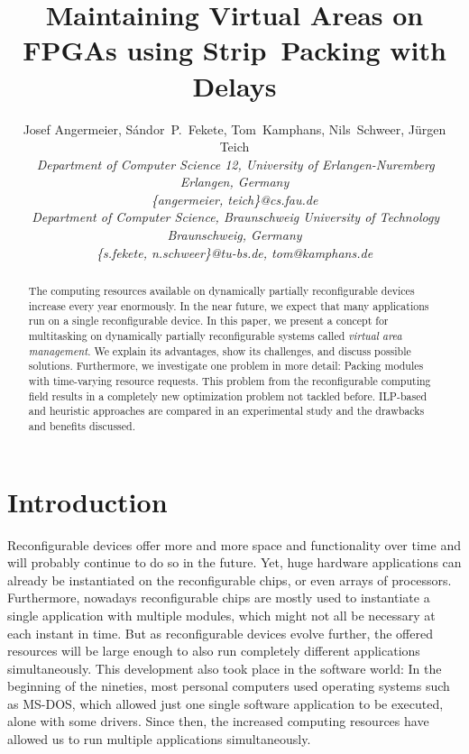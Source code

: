 \documentclass[10pt,journal]{IEEEtran}
\title{Maintaining Virtual Areas on FPGAs using Strip~Packing with Delays}
\author{{Josef Angermeier{\small },
S\'andor~P.~Fekete{\small },
Tom~Kamphans{\small },
Nils~Schweer{\small },
J\"urgen Teich{\small }}
\vspace{1.6mm}\\
\fontsize{10}{10}\selectfont\itshape
\,Department of Computer Science 12, University of Erlangen-Nuremberg\\
Erlangen, Germany\\
\fontsize{9}{9}\selectfont\ttfamily\upshape
\{angermeier, teich\}@cs.fau.de\vspace{1.2mm}\\
\fontsize{10}{10}\selectfont\rmfamily\itshape
\,Department of Computer Science, Braunschweig University of Technology\\
Braunschweig, Germany\\
\fontsize{9}{9}\selectfont\ttfamily\upshape
\{s.fekete, n.schweer\}@tu-bs.de, tom@kamphans.de}
\begin{document}
\maketitle
\begin{abstract}
  The computing resources available on dynamically partially
  reconfigurable devices increase every year enormously. In the near
  future, we expect that many applications run on a single
  reconfigurable device. In this paper, we present a concept for
  multitasking on dynamically partially reconfigurable systems called
  {\em virtual area management}. We explain its advantages, show its
  challenges, and discuss possible solutions. Furthermore, we investigate
  one problem in more detail: Packing modules with time-varying 
  resource requests.
  This problem
  from the reconfigurable computing field results in a completely new
  optimization problem not tackled before. ILP-based and heuristic
  approaches are compared in an experimental study and the drawbacks
  and benefits discussed.

\end{abstract}



\section{Introduction}
Reconfigurable devices offer more and more space and functionality
over time and will probably continue to do so in the future. Yet, huge hardware
applications can already be instantiated on the reconfigurable chips,
or even arrays of processors. Furthermore, nowadays reconfigurable
chips are mostly used to instantiate a single application with
multiple modules, which might not all be necessary at each instant in
time. But as reconfigurable devices evolve further, the offered
resources will be large enough to also run completely different
applications simultaneously. This development also took place
in the software world: In the beginning of the nineties, most personal
computers used operating systems such as MS-DOS, 
which allowed just one single
software application to be executed, alone with some drivers. 
Since then, the increased computing resources have allowed us to run multiple
applications simultaneously.
\end{document}
